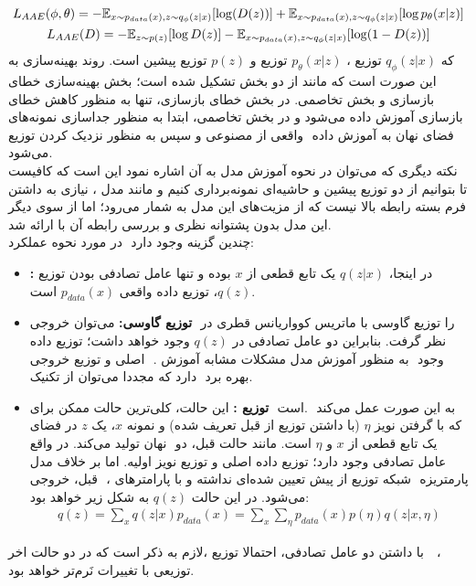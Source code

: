\begin{gather}
	L_{AAE}(\phi, \theta) = - \mathbb E_{x \sim p_{data}(x), z \sim q_\phi(z|x)} [\log (D(z))] + \mathbb E_{x \sim p_{data}(x), z \sim q_\phi(z|x)}[\log p_\theta(x|z)]\\
	L_{AAE}(D) = - \mathbb E_{z \sim p(z)} [\log D(z)] - \mathbb E_{x \sim p_{data}(x), z \sim q_\phi(z|x)} [\log (1 - D(z))]
\end{gather}
که $q_\phi(z|x)$ توزیع \encoder{}،
$p_\theta(x|z)$
توزیع \decoder{} و $p(z)$ توزیع پیشین است. روند بهینه‌سازی به این صورت است که مانند \gan{} از دو بخش تشکیل شده است؛ بخش بهینه‌سازی خطای بازسازی و بخش تخاصمی. در بخش خطای بازسازی، تنها \autoencoder{} به منظور کاهش خطای بازسازی آموزش داده می‌شود و در بخش تخاصمی، ابتدا \discriminator{} به منظور جداسازی نمونه‌های واقعی از مصنوعی و سپس \encoder{} به منظور نزدیک کردن توزیع \marginal{}‎ فضای نهان به \priordist{} آموزش داده می‌شود.\\
نکته دیگری که می‌توان در نحوه آموزش مدل به آن اشاره نمود این است که کافیست تا بتوانیم از دو توزیع پیشین و حاشیه‌ای \encoder{} نمونه‌برداری کنیم و مانند مدل \vae{}، نیازی به داشتن فرم بسته رابطه بالا نیست که از مزیت‌های این مدل به شمار می‌رود؛ اما از سوی دیگر این مدل بدون پشتوانه نظری و بررسی رابطه آن با \likelihood{} ارائه شد.\\
در مورد نحوه عملکرد ‎\encoder{}‎ چندین گزینه وجود دارد:
\begin{itemize}
	\item \textbf{\deterministic{}:}
	      در اینجا، $q(z|x)$ یک تابع قطعی از $x$ بوده و تنها عامل تصادفی بودن توزیع  $q(z)$، توزیع داده واقعی $p_{data}‎(x)$ است.
	\item \textbf{توزیع \posterior{} گاوسی:}
	      می‌توان خروجی ‎\encoder{}‎ را توزیع گاوسی با ماتریس کوواریانس قطری در نظر گرفت. بنابراین دو عامل تصادفی در $q(z)$ وجود خواهد داشت؛ توزیع داده اصلی و توزیع خروجی ‎\encoder{}‎ . به منظور آموزش مدل مشکلات مشابه آموزش ‎\vae{}‎ وجود دارد که مجددا می‌توان از تکنیک ‎\reparametrization{}‎ بهره برد.
	\item \textbf{ توزیع \posterior{}:}
	      این حالت، کلی‌ترین حالت ممکن برای ‎‎\encoder{}‎ است. ‎\encoder{}‎ به این صورت عمل می‌کند که با گرفتن نویز $‎‎\eta$ (با داشتن توزیع از قبل تعریف شده) و نمونه $x$، یک $z$ در فضای نهان تولید می‌کند. در واقع ‎\encoder{}‎ یک تابع قطعی از $x$ و $‎\eta$ است. مانند حالت قبل، دو عامل تصادفی وجود دارد؛ توزیع داده اصلی و توزیع نویز اولیه. اما بر خلاف مدل قبل، خروجی ‎\encoder{}‎ ، توزیع از پیش تعیین شده‌ای نداشته و با پارامترهای ‎شبکه \encoder{}‎ پارمتریزه می‌شود. در این حالت $q(z)$ به شکل زیر خواهد بود:
	      \begin{gather}
		      q(z) = \sum_x q(z|x) p_{data}(x) = \sum_x \sum_\eta p_{data}(x) p(\eta)  q(z|x, \eta)
	      \end{gather}
\end{itemize}
لازم به ذکر است که در دو حالت اخر، ‎با داشتن دو عامل تصادفی، احتمالا توزیع  ‎\marginal{}‎ ‎\encoder{}‎ ، توزیعی با تغییرات  نَرم‌تر خواهد بود.
